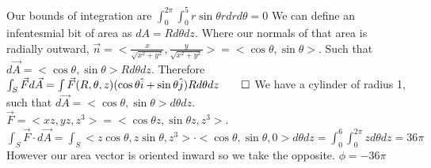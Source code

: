 \documentclass{article}
\begin{document}
Our bounds of integration are $\int_0^{2\pi} \int_0^5 r \sin \theta r dr d\theta = 0$
\proof
We can define an infentesmial bit of area as $dA = Rd\theta dz$.
Where our normals of that area is radially outward, $\vec{n} = <\frac{x}{\sqrt{x^2+y^2}},\frac{y}{\sqrt{x^2+y^2}}> = <\cos \theta, \sin \theta>$.
Such that $d\vec{A} = <\cos \theta, \sin \theta> R d\theta dz$.
Therefore $\int_S \vec{F} d\vec{A} = \int \vec{F}(R, \theta, z) (\cos \theta \hat{i} + \sin \theta \hat{j}) R d\theta dz \qed$
\sol
We have a cylinder of radius 1, such that $d\vec{A} = <\cos \theta, \sin \theta> d\theta dz$.
$\vec{F} = <xz,yz,z^3> = <\cos \theta z, \sin \theta z , z^3>$.
$\int_S \vec{F} \cdot d\vec{A} = \int_S <z\cos \theta, z \sin \theta, z^3> \cdot <\cos \theta, \sin \theta, 0 > d\theta dz
= \int_0^6 \int_0^{2\pi} z d\theta dz = 36\pi$ However our area vector is oriented inward so we take the opposite. $\phi = -36\pi$
\end{document}
